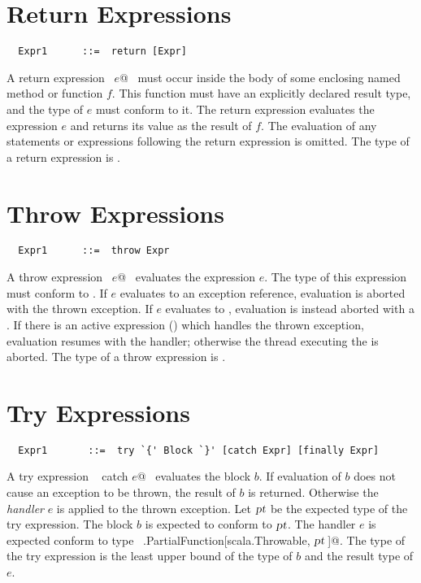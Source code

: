 \section{Return Expressions}

\syntax\begin{lstlisting}
  Expr1      ::=  return [Expr]
\end{lstlisting}

A return expression ~\lstinline@return $e$@~ must occur inside the
body of some enclosing named method or function $f$. This function
must have an explicitly declared result type, and the type of $e$ must
conform to it. The return expression evaluates the expression $e$ and
returns its value as the result of $f$. The evaluation of any statements or
expressions following the return expression is omitted. The type of 
a return expression is .



\section{Throw Expressions}

\syntax\begin{lstlisting}
  Expr1      ::=  throw Expr
\end{lstlisting}

A throw expression ~\lstinline@throw $e$@~ evaluates the expression
$e$. The type of this expression must conform to
.  If $e$ evaluates to an exception
reference, evaluation is aborted with the thrown exception. If $e$
evaluates to , evaluation is instead aborted with a
. If there is an active
 expression () which handles the thrown
exception, evaluation resumes with the handler; otherwise the thread
executing the  is aborted.  The type of a throw expression
is .

\section{Try Expressions}\label{sec:try}

\syntax\begin{lstlisting}
  Expr1       ::=  try `{' Block `}' [catch Expr] [finally Expr]
\end{lstlisting}

A try expression ~ catch $e$@~ evaluates the block
$b$.  If evaluation of $b$ does not cause an exception to be
thrown, the result of $b$ is returned. Otherwise the {\em
handler} $e$ is applied to the thrown exception.  Let $\mbox{\sl pt}$
be the expected type of the try expression.  The block $b$ is
expected to conform to $\mbox{\sl pt}$.  The handler $e$ is expected
conform to type ~\lstinline@scala.PartialFunction[scala.Throwable, $\mbox{\sl pt}\,$]@.
The type of the try expression is the least upper bound of the type of
$b$ and the result type of $e$.


